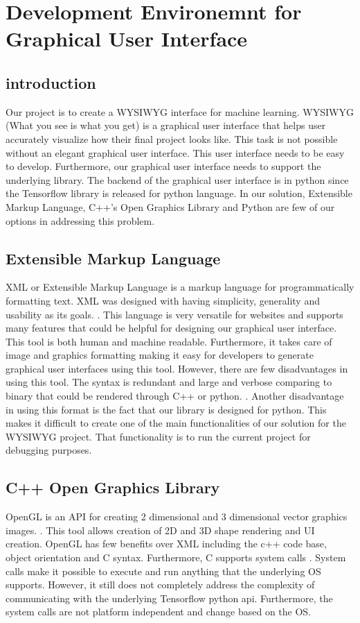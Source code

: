 \documentclass[journal,10pt,onecolumn,compsoc]{IEEEtran} \usepackage[margin=1.0in]{geometry} \usepackage{pdfpages} \usepackage{graphicx}
\begin{document}
\section{Development Environemnt for Graphical User Interface}
\subsection{introduction}
Our project is to create a WYSIWYG interface for machine learning. 
WYSIWYG (What you see is what you get) is a graphical user interface that helps user accurately visualize how their final project looks like. 
This task is not possible without an elegant graphical user interface. 
This user interface needs to be easy to develop. 
Furthermore, our graphical user interface needs to support the underlying library. 
The backend of the graphical user interface is in python since the Tensorflow library is released for python language. 
In our solution, Extensible Markup Language, C++’s Open Graphics Library and Python are few of our options in addressing this problem.

\subsection{Extensible Markup Language}
XML or Extensible Markup Language is a markup language for programmatically formatting text. 
XML was designed with having simplicity, generality and usability as its goals. \cite{xml1}. 
This language is very versatile for websites and supports many features that could be helpful for designing our graphical user interface. 
This tool is both human and machine readable. 
Furthermore, it takes care of image and graphics formatting making it easy for developers to generate graphical user interfaces using this tool. 
However, there are few disadvantages in using this tool. 
The syntax is redundant and large and verbose comparing to binary that could be rendered through C++ or python. \cite{xml2}. 
Another disadvantage in using this format  is the fact that our library is designed for python. 
This makes it difficult to create one of the main functionalities of our solution for the WYSIWYG project. 
That functionality is to run the current project for debugging purposes.

\subsection{C++ Open Graphics Library}
OpenGL is an API for creating 2 dimensional and 3 dimensional vector graphics images. \cite{xml3}. 
This tool allows creation of 2D and 3D shape rendering and UI creation. 
OpenGL has few benefits over XML including the c++ code base, object orientation and C syntax. 
Furthermore, C supports system calls . 
System calls make it possible to execute and run anything that the underlying OS supports. 
However, it still does not completely address the complexity of communicating with the underlying Tensorflow python api. 
Furthermore, the system calls are not platform independent and change based on the OS.
\end{document}

